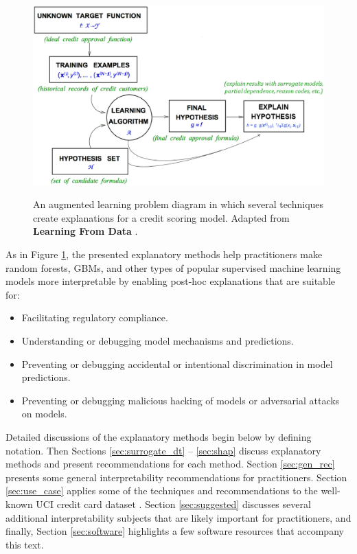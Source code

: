 \documentclass[11pt]{asaproc}
\begin{document}
\begin{figure}[htb]
	\begin{center}
		\includegraphics[scale=0.33]{img/figure_1.eps}
		\label{fig:learning_problem}
		\caption{An augmented learning problem diagram in which several techniques create explanations for a credit scoring model. Adapted from \textbf{Learning From Data} \cite{lfd}.}
	\end{center}
\end{figure}	
	
As in Figure \ref{fig:learning_problem}, the presented explanatory methods help practitioners make random forests, GBMs, and other types of popular supervised  machine learning models more interpretable by enabling post-hoc explanations that are suitable for:\\

\begin{itemize}
	\item Facilitating regulatory compliance.
	\item Understanding or debugging model mechanisms and predictions.
	\item Preventing or debugging accidental or intentional discrimination in model predictions.
	\item Preventing or debugging malicious hacking of models or adversarial attacks on models.
\end{itemize}

Detailed discussions of the explanatory methods begin below by defining notation. Then Sections \ref{sec:surrogate_dt} -- \ref{sec:shap} discuss explanatory methods and present recommendations for each method. Section \ref{sec:gen_rec} presents some general interpretability recommendations for practitioners. Section \ref{sec:use_case} applies some of the techniques and recommendations to the well-known UCI credit card dataset \cite{uci}. Section \ref{sec:suggested} discusses several additional interpretability subjects that are likely important for practitioners, and finally, Section \ref{sec:software} highlights a few software resources that accompany this text. 
\end{document}
